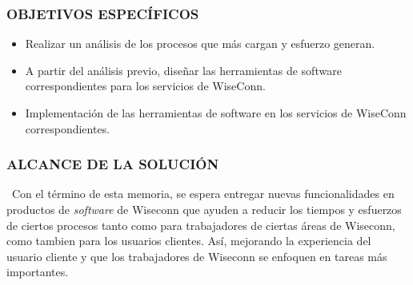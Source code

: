 \subsubsection{OBJETIVOS ESPECÍFICOS}
\begin{itemize}
    \item Realizar un análisis de los procesos que más cargan y esfuerzo generan.\iffalse, como también de funcionalidades/herramientas necesarias para el plan gratuito.\fi
    \item A partir del análisis previo, diseñar las herramientas de software correspondientes para los servicios de WiseConn.
    \item Implementación de las herramientas de software en los servicios de WiseConn correspondientes.
\end{itemize}

\subsubsection{ALCANCE DE LA SOLUCIÓN}\
Con el término de esta memoria, se espera entregar nuevas funcionalidades en productos de \textit{software} de Wiseconn que ayuden a reducir los tiempos y esfuerzos de ciertos procesos tanto como para trabajadores de ciertas áreas de Wiseconn, como tambien para los usuarios clientes. Así, mejorando la experiencia del usuario cliente y que los trabajadores de Wiseconn se enfoquen en tareas más importantes.
\iffalse
Al finalizar esta memoria se espera reducir los tiempos y esfuerzos de ciertos procesos en las áreas de soporte y producción de la empresa, ya sea, mejorando herramientas internas o transfiriendo tareas/procesos al usuario cliente. \iffalse También, ayudar a reducir la brecha de cobros en servicios SaaS con alternativas gratuitas de ciertas funcionalidades, lo que permitiría que el plan gratuito de Wiseconn cumpla con las especificaciones comerciales.\fi
\fi